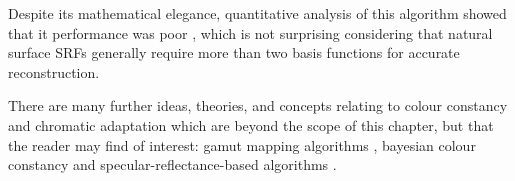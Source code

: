 Despite its mathematical elegance, quantitative analysis of this algorithm showed that it performance was poor \cite{brainard_bayesian_1994, finlayson_color_1995}, which is not surprising considering that natural surface \glspl{SRF} generally require more than two basis functions for accurate reconstruction.

\bigskip

There are many further ideas, theories, and concepts relating to colour constancy and chromatic adaptation which are beyond the scope of this chapter, but that the reader may find of interest: gamut mapping algorithms \citep{forsyth_colour_1990,forsyth_novel_1990,forsyth_colour_1989,finlayson_color_1996}, bayesian colour constancy \citep{finlayson_color_2001, brainard_bayesian_2006,gazzaniga_bayesian_2009, brainard_bayesian_1994,gehler_bayesian_2008} and specular-reflectance-based algorithms \citep{mollon_monge_2006, morimoto_discrimination_2018,hurlbert_computational_1998}.









